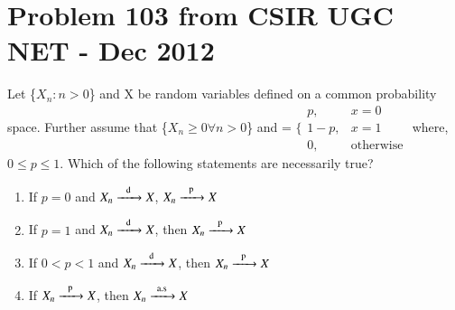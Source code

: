 \documentclass[journal,12pt,twocolumn]{IEEEtran}
\begin{document}
\section{\textbf{Problem 103 from CSIR UGC NET - Dec 2012}}
Let \{$X_n: n>0$\} and X be random variables defined on a common probability space. Further assume that \{$X_n \geq 0 \forall n > 0$\} and \newline
{} = $\bigg\{ \begin{array}{lr}
    p, & x = 0  \\
    1-p, & x =1 \\
     0, &\text{otherwise} 
\end{array}$\newline
where, $0 \leq p \leq 1$. Which of the following statements are necessarily true?
\begin{enumerate}
    \item If $p = 0$ and $X_n \ce{->[d]} X$, $X_n \ce{->[p]} X$ 
    \item If $p = 1$ and $X_n \ce{->[d]} X$, then $X_n  \ce{->[p]} X$
    \item If $0<p<1$ and $X_n \ce{->[d]} X$, then $X_n \ce{->[p]} X$
    \item If $X_n \ce{->[p]} X$, then $X_n  \ce{->T[a.s]} X$
\end{enumerate}
\end{document}
